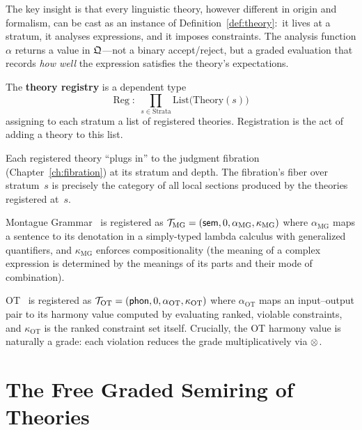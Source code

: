 The key insight is that every linguistic theory, however different in
origin and formalism, can be cast as an instance of
Definition~\ref{def:theory}:\ it lives at a stratum, it analyses
expressions, and it imposes constraints.  The analysis function
$\alpha$ returns a value in $\mathfrak{Q}$---not a binary accept/reject,
but a graded evaluation that records \emph{how well} the expression
satisfies the theory's expectations.

\begin{definition}
\label{def:registry}
The \textbf{theory registry} is a dependent type
\[
  \mathrm{Reg} \;:\; \prod_{s \in \mathrm{Strata}}
  \mathrm{List}\bigl(\mathrm{Theory}(s)\bigr)
\]
assigning to each stratum a list of registered theories.
Registration is the act of adding a theory to this list.
\end{definition}

Each registered theory ``plugs in'' to the judgment fibration
(Chapter~\ref{ch:fibration}) at its stratum and depth.  The
fibration's fiber over stratum~$s$ is precisely the category of all
local sections produced by the theories registered at~$s$.

\begin{example}
\label{ex:montague-theory}
Montague Grammar~\cite{montague1973} is registered as
$\mathcal{T}_{\mathrm{MG}} = (\mathsf{sem}, 0, \alpha_{\mathrm{MG}},
\kappa_{\mathrm{MG}})$ where $\alpha_{\mathrm{MG}}$ maps a
sentence to its denotation in a simply-typed lambda calculus with
generalized quantifiers, and $\kappa_{\mathrm{MG}}$ enforces
compositionality (the meaning of a complex expression is determined
by the meanings of its parts and their mode of combination).
\end{example}

\begin{example}
\label{ex:ot-theory}
OT~\cite{prince1993} is registered as $\mathcal{T}_{\mathrm{OT}} =
(\mathsf{phon}, 0, \alpha_{\mathrm{OT}}, \kappa_{\mathrm{OT}})$ where
$\alpha_{\mathrm{OT}}$ maps an input--output pair to its harmony
value computed by evaluating ranked, violable constraints, and
$\kappa_{\mathrm{OT}}$ is the ranked constraint set itself.
Crucially, the OT harmony value is naturally a grade: each violation
reduces the grade multiplicatively via $\otimes$.
\end{example}

\section{The Free Graded Semiring of Theories}
\label{sec:free-semiring}


